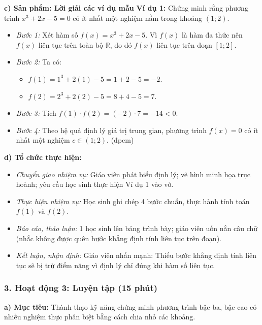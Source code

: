\documentclass[12pt, a4paper]{article}
\begin{document}
\noindent \textbf{c) Sản phẩm: Lời giải các ví dụ mẫu}
\textbf{Ví dụ 1:} Chứng minh rằng phương trình $x^3 + 2x - 5 = 0$ có ít nhất một nghiệm nằm trong khoảng $(1; 2)$.
\begin{itemize}[leftmargin=0.6cm]
    \item \textit{Bước 1:} Xét hàm số $f(x) = x^3 + 2x - 5$. Vì $f(x)$ là hàm đa thức nên $f(x)$ liên tục trên toàn bộ $\mathbb{R}$, do đó $f(x)$ liên tục trên đoạn $[1; 2]$.
    \item \textit{Bước 2:} Ta có:
    \begin{itemize}
        \item $f(1) = 1^3 + 2(1) - 5 = 1 + 2 - 5 = -2$.
        \item $f(2) = 2^3 + 2(2) - 5 = 8 + 4 - 5 = 7$.
    \end{itemize}
    \item \textit{Bước 3:} Tích $f(1) \cdot f(2) = (-2) \cdot 7 = -14 < 0$.
    \item \textit{Bước 4:} Theo hệ quả định lý giá trị trung gian, phương trình $f(x) = 0$ có ít nhất một nghiệm $c \in (1; 2)$. (đpcm)
\end{itemize}

\noindent \textbf{d) Tổ chức thực hiện:}
\begin{itemize}[leftmargin=0.8cm]
    \item \textit{Chuyển giao nhiệm vụ:} Giáo viên phát biểu định lý; vẽ hình minh họa trục hoành; yêu cầu học sinh thực hiện Ví dụ 1 vào vở.
    \item \textit{Thực hiện nhiệm vụ:} Học sinh ghi chép 4 bước chuẩn, thực hành tính toán $f(1)$ và $f(2)$.
    \item \textit{Báo cáo, thảo luận:} 1 học sinh lên bảng trình bày; giáo viên uốn nắn câu chữ (nhắc không được quên bước khẳng định tính liên tục trên đoạn).
    \item \textit{Kết luận, nhận định:} Giáo viên nhấn mạnh: Thiếu bước khẳng định tính liên tục sẽ bị trừ điểm nặng vì định lý chỉ đúng khi hàm số liên tục.
\end{itemize}

\subsubsection*{3. Hoạt động 3: Luyện tập (15 phút)}

\noindent \textbf{a) Mục tiêu:}
Thành thạo kỹ năng chứng minh phương trình bậc ba, bậc cao có nhiều nghiệm thực phân biệt bằng cách chia nhỏ các khoảng.
\end{document}
